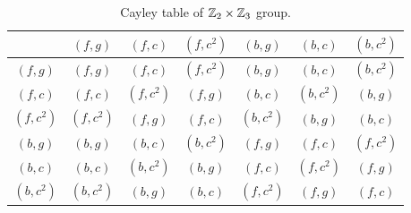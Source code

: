 \begin{table}[H]
    \centering
    \begin{tabular}{|c|cccccc|}
        \hline 
         & $(f,g)$ & $(f,c)$ & $(f,c^2)$ & $(b,g)$ & $(b,c)$ & $(b,c^2)$ \\ \hline
         $(f,g)$   & $(f,g)$   & $(f,c)$   & $(f,c^2)$ & $(b,g)$   & $(b,c)$   & $(b,c^2)$ \\
         $(f,c)$   & $(f,c)$   & $(f,c^2)$ & $(f,g)$   & $(b,c)$   & $(b,c^2)$ & $(b,g)$ \\
         $(f,c^2)$ & $(f,c^2)$ & $(f,g)$   & $(f,c)$   & $(b,c^2)$ & $(b,g)$   & $(b,c)$ \\
         $(b,g)$   & $(b,g)$   & $(b,c)$   & $(b,c^2)$ & $(f,g)$   & $(f,c)$   & $(f,c^2)$ \\
         $(b,c)$   & $(b,c)$   & $(b,c^2)$ & $(b,g)$   & $(f,c)$   & $(f,c^2)$ & $(f,g)$ \\
         $(b,c^2)$ & $(b,c^2)$ & $(b,g)$   & $(b,c)$   & $(f,c^2)$ & $(f,g)$   & $(f,c)$ \\ \hline
    \end{tabular}
    \caption{Cayley table of $\mathbb{Z}_2 \times \mathbb{Z}_3$ group.}
    \label{tab: Z2 X Z3 Cayley table}
\end{table}

